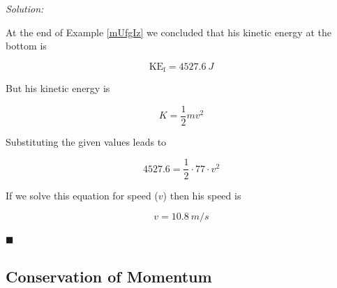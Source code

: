 \documentclass[dvipsnames]{article}
\begin{document}
\textit{Solution:} 

At the end of Example \ref{mUfgIz} we concluded that his kinetic energy at the bottom is 

\begin{equation*}
    \mathrm{KE_f} = \SI{4527.6}{J}
\end{equation*}

But his kinetic energy is

\begin{equation*}
    K = \frac{1}{2} m v^2
\end{equation*}

Substituting the given values leads to 

\begin{equation*}
    4527.6 = \frac{1}{2} \cdot 77 \cdot v^2
\end{equation*}

If we solve this equation for speed ($v$) then his speed is

\begin{equation*}
    v = \SI{10.8}{m/s}
\end{equation*}

\hfill $\blacksquare$

\subsection{Conservation of Momentum}
\end{document}
